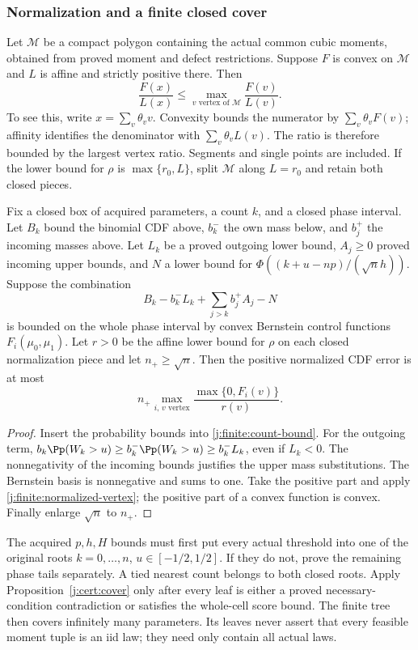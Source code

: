 \subsubsection{Normalization and a finite closed cover}
Let $\mathcal M$ be a compact polygon containing the actual common
cubic moments, obtained from proved moment and defect restrictions.
Suppose $F$ is convex on $\mathcal M$ and $L$ is affine and strictly
positive there. Then
\begin{equation}\label{j:finite:normalized-vertex}
 \frac{F(x)}{L(x)}\le
 \max_{v\text{ vertex of }\mathcal M}\frac{F(v)}{L(v)}.
\end{equation}
To see this, write $x=\sum_v\theta_vv$. Convexity bounds the numerator
by $\sum_v\theta_vF(v)$; affinity identifies the denominator with
$\sum_v\theta_vL(v)$. The ratio is therefore bounded by the largest
vertex ratio. Segments and single points are included. If the lower
bound for $\rho$ is $\max\{r_0,L\}$, split $\mathcal M$ along
$L=r_0$ and retain both closed pieces.

\begin{proposition}\label{j:finite:count-cell}
Fix a closed box of acquired parameters, a count $k$, and a closed
phase interval. Let $B_k$ bound the binomial CDF above, $b_k^-$ the own
mass below, and $b_j^+$ the incoming masses above. Let $L_k$ be a
proved outgoing lower bound, $A_j\ge0$ proved incoming upper bounds,
and $N$ a lower bound for $\Phi((k+u-np)/(\sqrt n h))$.
Suppose the combination
\[
 B_k-b_k^-L_k+\sum_{j>k}b_j^+A_j-N
\]
is bounded on the whole phase interval by convex Bernstein control
functions $F_i(\mu_0,\mu_1)$. Let $r>0$ be the affine lower bound for
$\rho$ on each closed normalization piece and let $n_+\ge\sqrt n$.
Then the positive normalized CDF error is at most
\[
 n_+\max_{i,\,v\text{ vertex}}
       \frac{\max\{0,F_i(v)\}}{r(v)}.
\]
\end{proposition}
\begin{proof}
Insert the probability bounds into \eqref{j:finite:count-bound}. For the outgoing
term, $b_k\Pp(W_k>u)\ge b_k^-\Pp(W_k>u)\ge b_k^-L_k$,
even if $L_k<0$. The nonnegativity of the incoming bounds justifies the
upper mass substitutions. The Bernstein basis is nonnegative and sums
to one. Take the positive part and apply \eqref{j:finite:normalized-vertex};
the positive part of a convex function is convex. Finally enlarge
$\sqrt n$ to $n_+$.
\end{proof}

The acquired $p,h,H$ bounds must first put every actual threshold into
one of the original roots $k=0,\ldots,n$, $u\in[-1/2,1/2]$.
If they do not, prove the remaining phase tails separately. A tied
nearest count belongs to both closed roots. Apply
Proposition~\ref{j:cert:cover} only after every leaf is either a
proved necessary-condition contradiction or satisfies the whole-cell
score bound. The finite tree then covers infinitely many parameters.
Its leaves never assert that every feasible moment tuple is an iid law;
they need only contain all actual laws.


